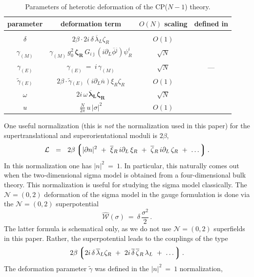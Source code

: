 \documentclass[epsfig,12pt]{article}
\def\beq{\begin{equation}}
\def\eeq{\end{equation}}
\def\beq{\begin{equation}}
\def\eeq{\end{equation}}
\newcommand{\ntwoo}{${\mathcal N}= \left(0,2\right) $ }
\newcommand{\p}{\partial}
\newcommand{\wt}{\widetilde}
\newcommand{\ov}{\overline}
\newcommand{\mc}[1]{\mathcal{#1}}
\newcommand{\lgr}{\left\lgroup}
\newcommand{\rgr}{\right\rgroup}
\newcommand{\bxir}{\ov{\xi}{}_R}
\newcommand{\xir}{\xi_R}
\newcommand{\bzr}{\ov{\zeta}{}_R}
\newcommand{\zr}{\zeta_R}
\newcommand{\nbar}{\ov{n}}
\newcommand{\lal}{\lambda_L}
\newcommand{\blal}{\ov{\lambda}{}_L}
\newcommand{\bphi}{\ov{\phi}{}}
\newcommand{\bj}{{\bar \jmath}}
\newcommand{\ssm}{{\scriptscriptstyle(M)}}
\newcommand{\sse}{{\scriptscriptstyle(E)}}
\begin{document}
{\begin{table}[h]
\begin{center}
\begin{tabular}{cccc}
 parameter & deformation term & $O(N)$ scaling  &  defined in \\[0.3cm]
\hline
\hline
\\[-0.3cm]
$\delta$  & $ 2\beta \cdot 2i\, \delta\, \blal \zr $   & $ O(1) $ &  \cite{EdTo,SY1} \\[0.3cm]
$\gamma_\ssm$ & $ \gamma_\ssm\,g_0^2\, \boldsymbol{\zr}\, G_{i\bj} (i \p_L \bphi^\bj)\psi_R^i $ & 
$ \sqrt{N} $ & \cite{SY1} \\[0.3cm]
$ \gamma_\sse $ & $ \gamma_\sse ~=~ i\, \gamma_\ssm $ & $ \sqrt{N} $ & --- \\[0.3cm] 
$\wt{\gamma}{}_\sse$ & $ 2\beta \cdot \wt{\gamma}{}_\sse\, (i\p_L \nbar) \xir \zr $   & $ O(1) $   & \cite{BSY1} \\[0.3cm]
$\omega$  & $ 2i\, \omega\, \boldsymbol{\blal} \boldsymbol{\zr} $  & $ \sqrt{N} $ & \cite{SYhet} \\[0.3cm]
$u$    & $ \frac{N}{2\pi}\, u\, |\sigma|^2 $  & $O(1)$ & \cite{SYhet} \\[0.3cm]
\end{tabular}
\caption{Parameters of heterotic deformation of the CP($N-1$) theory.}
\label{app:par}
\end{center}
\end{table}
One useful normalization (this is {\it not} the normalization used in this paper) for the 
supertranslational and superorientational moduli is $ 2\beta $,
\beq
  \mc{L} ~~=~~ 2\beta \lgr |\p n|^2 ~+~ \bxir\, i\p_L\, \xir ~+~ \bzr\, i\p_L\, \zr ~+~ \dots \rgr.
\eeq
In this normalization one has $ |n|^2 ~=~ 1 $.
In particular, this naturally comes out when the two-dimensional sigma model is obtained from
a four-dimensional bulk theory.
This normalization is useful for studying the sigma model classically. 
The \ntwoo deformation of the sigma model in the gauge formulation is done via the \ntwoo superpotential
\beq
	\hat{\mc{W}}(\sigma) ~=~ \delta\,\frac{\sigma^2}{2}\,.
\eeq
The latter formula is schematical only, as we do not use \ntwoo superfields in this paper. 
Rather, the superpotential leads to the couplings of the type
\beq
\label{Wterms}
	2\beta \lgr 2i\, \delta\, \blal \zr ~+~ 2i\, \ov{\delta}\, \bzr\, \lal ~+~ \dots \rgr .
\eeq
The deformation parameter $ \wt{\gamma} $ was defined in the $|n|^2 ~=~ 1 $ normalization,
}
\end{document}

